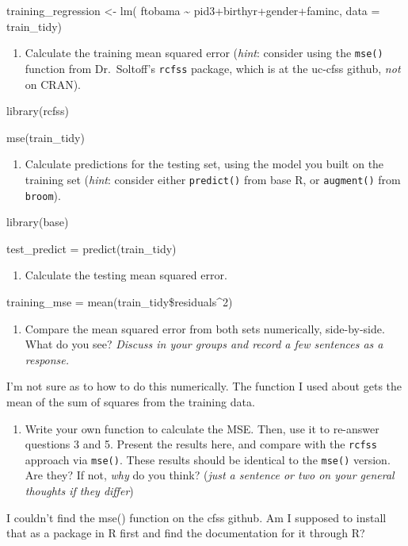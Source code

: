 \documentclass[
]{article}
\providecommand{\tightlist}{%
  \setlength{\itemsep}{0pt}\setlength{\parskip}{0pt}}
\begin{document}
training\_regression \textless- lm( ftobama \textasciitilde{}
pid3+birthyr+gender+faminc, data = train\_tidy)

\begin{enumerate}
\def\labelenumi{\arabic{enumi}.}
\setcounter{enumi}{2}
\tightlist
\item
  Calculate the training mean squared error (\emph{hint}: consider using
  the \texttt{mse()} function from Dr.~Soltoff's \texttt{rcfss} package,
  which is at the uc-cfss github, \emph{not} on CRAN).
\end{enumerate}

library(rcfss)

mse(train\_tidy)

\begin{enumerate}
\def\labelenumi{\arabic{enumi}.}
\setcounter{enumi}{3}
\tightlist
\item
  Calculate predictions for the testing set, using the model you built
  on the training set (\emph{hint}: consider either \texttt{predict()}
  from base R, or \texttt{augment()} from \texttt{broom}).
\end{enumerate}

library(base)

test\_predict = predict(train\_tidy)

\begin{enumerate}
\def\labelenumi{\arabic{enumi}.}
\setcounter{enumi}{4}
\tightlist
\item
  Calculate the testing mean squared error.
\end{enumerate}

training\_mse = mean(train\_tidy\$residuals\^{}2)

\begin{enumerate}
\def\labelenumi{\arabic{enumi}.}
\setcounter{enumi}{5}
\tightlist
\item
  Compare the mean squared error from both sets numerically,
  side-by-side. What do you see? \emph{Discuss in your groups and record
  a few sentences as a response.}
\end{enumerate}

I'm not sure as to how to do this numerically. The function I used about
gets the mean of the sum of squares from the training data.

\begin{enumerate}
\def\labelenumi{\arabic{enumi}.}
\setcounter{enumi}{6}
\tightlist
\item
  Write your own function to calculate the MSE. Then, use it to
  re-answer questions 3 and 5. Present the results here, and compare
  with the \texttt{rcfss} approach via \texttt{mse()}. These results
  should be identical to the \texttt{mse()} version. Are they? If not,
  \emph{why} do you think? (\emph{just a sentence or two on your general
  thoughts if they differ})
\end{enumerate}

I couldn't find the mse() function on the cfss github. Am I supposed to
install that as a package in R first and find the documentation for it
through R?
\end{document}
